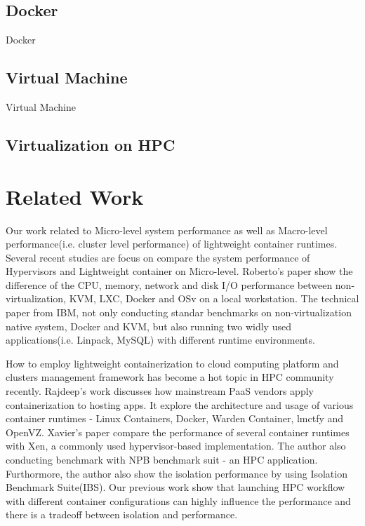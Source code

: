 \documentclass{article}
\begin{document}
\subsection{Docker}

Docker\cite{dockerwb}

\subsection{Virtual Machine}

Virtual Machine\cite{rosenblum2005virtual}

\subsection{Virtualization on HPC}

\section{Related Work}

Our work related to Micro-level system performance as well as Macro-level performance(i.e. cluster
level performance) of lightweight container runtimes. Several recent studies are focus on compare 
the system performance of Hypervisors and Lightweight container on Micro-level. Roberto's 
paper\cite{morabito2015hypervisors} show the difference of the CPU, memory, network and disk I/O 
performance between non-virtualization, KVM, LXC, Docker and OSv on a local workstation. The 
technical paper from IBM\cite{felter2014updated}, not only conducting standar benchmarks on 
non-virtualization native system, Docker and KVM, but also running two widly used 
applications(i.e. Linpack, MySQL) with different runtime environments.  

\medskip

How to employ lightweight containerization to cloud computing platform and clusters management 
framework has become a hot topic in HPC community recently. Rajdeep's 
work\cite{dua2014virtualization} discusses how mainstream PaaS vendors apply containerization to 
hosting apps. It explore the architecture and usage of various container runtimes - Linux 
Containers, Docker, Warden Container, lmctfy and OpenVZ. Xavier's paper\cite{xavier2013performance}
compare the performance of several container runtimes with Xen, a commonly used hypervisor-based 
implementation. The author also conducting benchmark with NPB benchmark suit - an HPC application. 
Furthormore, the author also show the isolation performance by using Isolation Benchmark Suite(IBS).
Our previous work\cite{zheng2015integrating} show that launching HPC workflow with 
different container configurations can highly influence the performance and there is a 
tradeoff between isolation and performance. 
\end{document}
